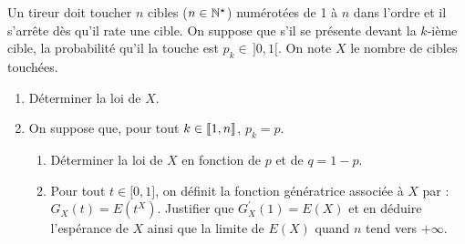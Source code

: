 \documentclass[a4paper, 11pt,reqno]{article}
\begin{document}
\begin{exercice}  \;
	Un tireur doit toucher $n$ cibles ($n\in\mathbb{N}^{\star}$) num\'erot\'ees de 1 \`a $n$ dans l'ordre et il s'arr\^ete d\`es qu'il rate une cible. On suppose que s'il se pr\'esente devant la $k$-i\`eme cible, la probabilit\'e qu'il la touche est $p_k\in \, \rbrack 0,1\lbrack$. On note $X$ le nombre de cibles touch\'ees.
	\begin{enumerate}
		\item D\'eterminer la loi de $X$.
		\item On suppose que, pour tout $k\in\llbracket  1,n\rrbracket$, $p_k=p$.
		      \begin{enumerate}
			      \item D\'eterminer la loi de $X$ en fonction de $p$ et de $q=1-p$.
			      \item Pour tout $t\in\lbrack 0,1\rbrack$, on d\'efinit la fonction g\'en\'eratrice associ\'ee \`a $X$ par : $G_X(t)=E(t^X).$
			            Justifier que $G_X^{\prime}(1)=E(X)$ et en d\'eduire l'esp\'erance de $X$ ainsi que la limite de $E(X)$ quand $n$ tend vers $+\infty$.
		      \end{enumerate}
	\end{enumerate}
\end{exercice}
\end{document}
